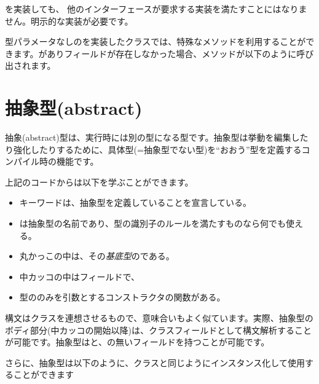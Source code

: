 
を実装しても、 他のインターフェースが要求する実装を満たすことにはなりません。明示的な実装が必要です。

型パラメータなしのを実装したクラスでは、特殊なメソッドを利用することができます。がありフィールドが存在しなかった場合、メソッドが以下のように呼び出されます。




\section{抽象型(abstract)}
\label{types-abstract}

抽象(abstract)型は、実行時には別の型になる型です。抽象型は挙動を編集したり強化したりするために、具体型(=抽象型でない型)を``おおう''型を定義するコンパイル時の機能です。


上記のコードからは以下を学ぶことができます。

\begin{itemize}
	\item {}キーワードは、抽象型を定義していることを宣言している。
	\item {}は抽象型の名前であり、型の識別子のルールを満たすものなら何でも使える。
	\item 丸かっこ\expr{()}の中は、その\emph{基底型}のである。
	\item 中カッコ\expr{$\left\{\right\}$}の中はフィールドで、
	\item {}型ののみを引数とするコンストラクタの関数がある。
\end{itemize}


構文はクラスを連想させるもので、意味合いもよく似ています。実際、抽象型のボディ部分(中カッコの開始以降)は、クラスフィールドとして構文解析することが可能です。抽象型はと、の無いフィールドを持つことが可能です。

さらに、抽象型は以下のように、クラスと同じようにインスタンス化して使用することができます

